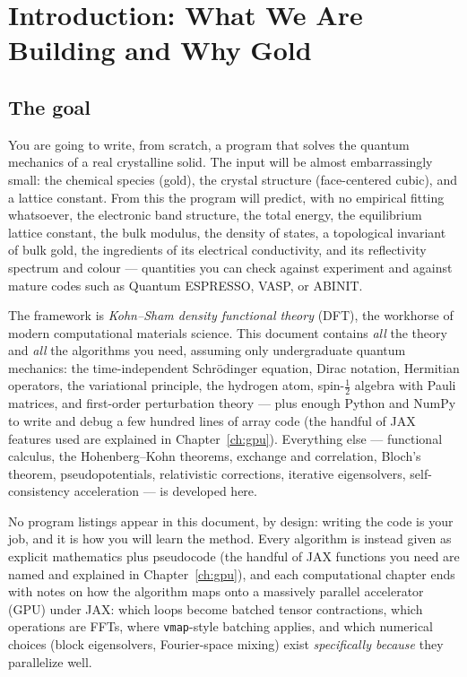 \chapter{Introduction: What We Are Building and Why Gold}
\label{ch:intro}

\section{The goal}

You are going to write, from scratch, a program that solves the quantum
mechanics of a real crystalline solid. The input will be almost embarrassingly
small: the chemical species (gold), the crystal structure (face-centered
cubic), and a lattice constant. From this the program will predict, with no
empirical fitting whatsoever, the electronic band structure, the total energy,
the equilibrium lattice constant, the bulk modulus, the density of states,
a topological invariant of bulk gold, the ingredients of its electrical
conductivity, and its reflectivity spectrum and colour --- quantities you
can check against experiment and against
mature codes such as Quantum ESPRESSO, VASP, or ABINIT.

The framework is \emph{Kohn--Sham density functional theory} (DFT), the
workhorse of modern computational materials science. This document contains
\emph{all} the theory and \emph{all} the algorithms you need, assuming only
undergraduate quantum mechanics: the time-independent Schr\"odinger equation,
Dirac notation, Hermitian operators, the variational principle, the
hydrogen atom, spin-$\tfrac12$ algebra with Pauli matrices, and first-order
perturbation theory --- plus enough Python and NumPy to write and debug a
few hundred lines of array code (the handful of JAX features used are
explained in Chapter~\ref{ch:gpu}). Everything
else --- functional calculus, the Hohenberg--Kohn theorems, exchange and
correlation, Bloch's theorem, pseudopotentials, relativistic corrections,
iterative eigensolvers, self-consistency acceleration --- is developed here.

No program listings appear in this document, by design: writing the code is
your job, and it is how you will learn the method. Every algorithm is instead
given as explicit mathematics plus pseudocode (the handful of JAX functions
you need are named and explained in Chapter~\ref{ch:gpu}), and each
computational chapter ends
with notes on how the algorithm maps onto a massively parallel accelerator
(GPU) under JAX: which loops become batched tensor contractions, which
operations are FFTs, where \texttt{vmap}-style batching applies,
and which numerical choices (block eigensolvers, Fourier-space mixing) exist
\emph{specifically because} they parallelize well.

